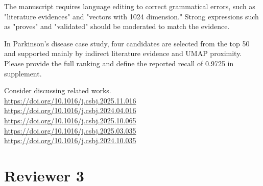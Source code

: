 \documentclass[11pt,american]{article}
\begin{document}
\begin{revresponse}

\end{revresponse}

\begin{revcomment}
The manuscript requires language editing to correct grammatical errors, such as "literature evidences" and "vectors with 1024 dimension."  Strong expressions such as "proves" and "validated" should be moderated to match the evidence.
\end{revcomment}

\begin{revresponse}

\end{revresponse}

\begin{revcomment}
In Parkinson's disease case study, four candidates are selected from the top 50 and supported mainly by indirect literature evidence and UMAP proximity. Please provide the full ranking and define the reported recall of 0.9725 in supplement.
\end{revcomment}

\begin{revresponse}

\end{revresponse}

\begin{revcomment}
Consider discussing related works.\\
\url{https://doi.org/10.1016/j.csbj.2025.11.016}\\
\url{https://doi.org/10.1016/j.csbj.2024.04.016}\\
\url{https://doi.org/10.1016/j.csbj.2025.10.065}\\
\url{https://doi.org/10.1016/j.csbj.2025.03.035}\\
\url{https://doi.org/10.1016/j.csbj.2024.10.035}
\end{revcomment}

\begin{revresponse}

\end{revresponse}

\reviewer
\section*{\normalsize{Reviewer 3}}
\end{document}
